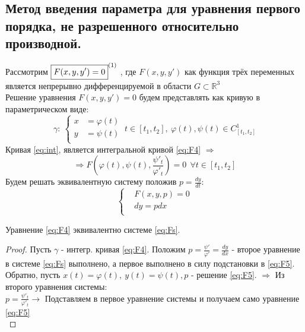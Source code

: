\subsection*{Метод введения параметра для уравнения первого порядка, не разрешенного относительно производной.}
\begin{proposition}
	Рассмотрим $ \boxed{F(x,  y, y') = 0}^{\eqnum\label{eq:F4}} \ $, где $ F(x, y, y') $ как функция трёх переменных является непрерывно дифференцируемой в области $ G \subset \mathbb{ R }^3 $ \\
	Решение уравнения $F(x, y, y') = 0 $ будем представлять как кривую в параметрическом виде: \\
	\begin{equation} \label{eq:int}
	\gamma: \	\left\{
	\begin{aligned}
		x &= \varphi(t)  \\
		y &= \psi(t) \\   
	\end{aligned}
	\right. \ t \in [t_1, t_2], \ \varphi(t), \psi(t) \in C^1_{[t_1, t_2]}                                             
	\end{equation}
	Кривая \eqref{eq:int}, является интегральной кривой \eqref{eq:F4} $ \Rightarrow $ \\
	\begin{equation} \label{eq:F5}
	 \Rightarrow F\left(\varphi(t), \psi(t), \frac{\psi'_t}{\varphi'_t}\right) = 0 \ \ \forall t \in [t_1, t_2] 
	\end{equation}
	Будем решать эквивалентную систему положив $ p = \frac{dy}{dt} $: 
	\begin{equation} \label{eq:Fs}
		\left\{
		\begin{aligned}
			&F(x, y, p) = 0  \\
			&dy = pdx \\   
		\end{aligned}
		\right.                                                          
	\end{equation}
\end{proposition}

\begin{proposition}
	Уравнение \eqref{eq:F4} эквивалентно системе \eqref{eq:Fs}.
\end{proposition}

\begin{proof}
	Пусть $ \gamma $ - интегр. кривая \eqref{eq:F4}. Положим $ p = \frac{\psi'}{\varphi'} = \frac{dy}{dx} $ - второе уравнение в системе \eqref{eq:Fs} выполнено, а первое выполнено в силу подстановки в \eqref{eq:F5}. Обратно, пусть $x(t) = \varphi(t), \ y(t) = \psi(t), p$ - решение \eqref{eq:F5}. $ \Rightarrow$ Из второго уравнения системы:\\ 
	$ p = \frac{\psi'_t}{\varphi'_t} \rightarrow $ Подставляем в первое уравнение системы и получаем само уравнение \eqref{eq:F5}\\
\end{proof}

